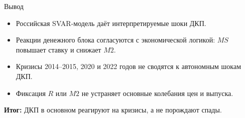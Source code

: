 \begin{frame}{Вывод}

\begin{itemize}
    \item Российская SVAR-модель даёт интерпретируемые шоки ДКП.

    \item Реакции денежного блока согласуются с экономической логикой:
    $MS$ повышает ставку и снижает $M2$.

    \item Кризисы 2014--2015, 2020 и 2022 годов не сводятся к автономным
    шокам ДКП.

    \item Фиксация $R$ или $M2$ не устраняет основные колебания цен и выпуска.
\end{itemize}

\vspace{0.25cm}

\textbf{Итог:} ДКП в основном реагируют на кризисы, а не порождают спады.

\end{frame}